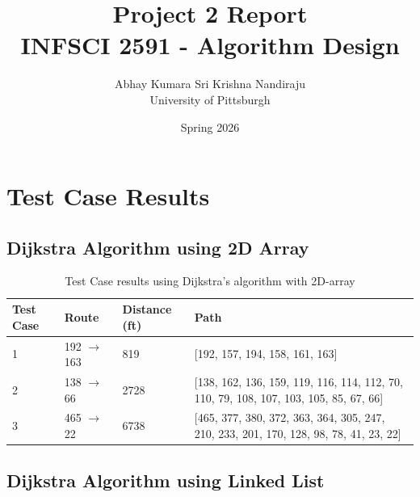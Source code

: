 \documentclass[11pt, a4paper]{article}
\title{\textbf{Project 2 Report}\\ \large INFSCI 2591 - Algorithm Design}
\author{Abhay Kumara Sri Krishna Nandiraju \\ University of Pittsburgh}
\date{Spring 2026}
\begin{document}
\maketitle


\section{Test Case Results}

\subsection{Dijkstra Algorithm using 2D Array}

\begin{table}[h!] %
\centering
\begin{tabular}{|l|l|l|p{8cm}|} %
\hline
\textbf{Test Case} & \textbf{Route} & \textbf{Distance (ft)} & \textbf{Path} \\ \hline
1 & 192 $\rightarrow$ 163 & 819 & [192, 157, 194, 158, 161, 163] \\ \hline
2 & 138 $\rightarrow$ 66 & 2728 & [138, 162, 136, 159, 119, 116, 114, 112, 70, 110, 79, 108, 107, 103, 105, 85, 67, 66] \\ \hline
3 & 465 $\rightarrow$ 22 & 6738 & [465, 377, 380, 372, 363, 364, 305, 247, 210, 233, 201, 170, 128, 98, 78, 41, 23, 22] \\ \hline
\end{tabular}
\caption{Test Case results using Dijkstra's algorithm with 2D-array}
\label{dij2d}
\end{table}


\subsection{Dijkstra Algorithm using Linked List}
\end{document}
